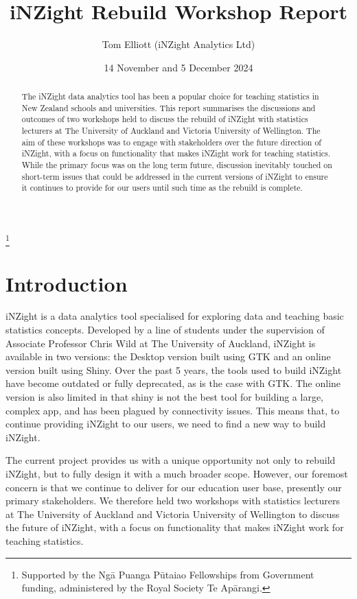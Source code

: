 \documentclass{article}
\title{iNZight Rebuild Workshop Report}
\author{Tom Elliott (iNZight Analytics Ltd)}
\date{14 November and 5 December 2024}
\begin{document}
\begin{titlepage}
    \maketitle

    \begin{abstract}
        The iNZight data analytics tool has been a popular choice for teaching statistics in New Zealand schools and universities. This report summarises the discussions and outcomes of two workshops held to discuss the rebuild of iNZight with statistics lecturers at The University of Auckland and Victoria University of Wellington. The aim of these workshops was to engage with stakeholders over the future direction of iNZight, with a focus on functionality that makes iNZight work for teaching statistics. While the primary focus was on the long term future, discussion inevitably touched on short-term issues that could be addressed in the current versions of iNZight to ensure it continues to provide for our users until such time as the rebuild is complete.
    \end{abstract}

    \vfill

    \centering
    \thanks{\noindent Supported by the Ngā Puanga Pūtaiao Fellowships from
    Government funding, administered by the Royal Society Te Apārangi.}
\end{titlepage}


\section{Introduction}

iNZight is a data analytics tool specialised for exploring data and teaching basic statistics concepts.
Developed by a line of students under the supervision of Associate Professor Chris Wild at The University of Auckland, iNZight is available in two versions: the Desktop version built using GTK and an online version built using Shiny\cite{Chang2021}.
Over the past 5 years, the tools used to build iNZight have become outdated or fully deprecated, as is the case with GTK.
The online version is also limited in that shiny is not the best tool for building a large, complex app, and has been plagued by connectivity issues.
This means that, to continue providing iNZight to our users, we need to find a new way to build iNZight.

The current project provides us with a unique opportunity not only to rebuild iNZight, but to fully design it with a much broader scope.
However, our foremost concern is that we continue to deliver for our education user base, presently our primary stakeholders.
We therefore held two workshops with statistics lecturers at The University of Auckland and Victoria University of Wellington to discuss the future of iNZight, with a focus on functionality that makes iNZight work for teaching statistics.
\end{document}
